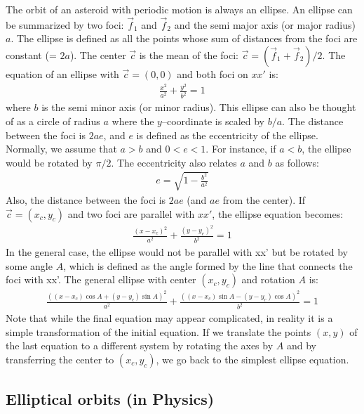 \begin{appendices}
The orbit of an asteroid with periodic motion is always an ellipse. An ellipse can be summarized by two foci: $\vec{f}_1$ and $\vec{f}_2$ and the semi major axis (or major radius) $a$. The ellipse is defined as all the points whose sum of distances from the foci are constant (= $2a$). The center $\vec{c}$ is the mean of the foci: $\vec{c} = (\vec{f}_1 + \vec{f}_2) / 2$. The equation of an ellipse with $\vec{c} = (0,0)$ and both foci on $xx'$ is:
\begin{eqnarray*}
\frac{x^2}{a^2} + \frac{y^2}{b^2} = 1
\end{eqnarray*}
where $b$ is the semi minor axis (or minor radius). This ellipse can also be thought of as a circle of radius $a$ where the $y$--coordinate is scaled by $b/a$. The distance between the foci is $2ae$, and $e$ is defined as the eccentricity of the ellipse. Normally, we assume that $a > b$ and $0 < e < 1$. For instance, if $a < b$, the ellipse would be rotated by $\pi/2$. The eccentricity also relates $a$ and $b$ as follows:
\begin{eqnarray*}
e = \sqrt{1 - \frac{b^2}{a^2}}
\end{eqnarray*}
Also, the distance between the foci is $2ae$ (and $ae$ from the center). If $\vec{c} = (x_c,y_c)$ and two foci are parallel with $xx'$, the ellipse equation becomes:
\begin{eqnarray*}
\frac{(x-x_c)^2}{a^2} + \frac{(y-y_c)^2}{b^2} = 1
\end{eqnarray*}
In the general case, the ellipse would not be parallel with xx' but be rotated by some angle $A$, which is defined as the angle formed by the line that connects the foci with xx'. The general ellipse with center $(x_c,y_c)$ and rotation $A$ is:
\begin{eqnarray*}
\frac{((x-x_c)\cos{A} + (y-y_c)\sin{A})^2}{a^2} + \frac{((x-x_c)\sin{A} - (y-y_c)\cos{A})^2}{b^2} = 1
\end{eqnarray*}
Note that while the final equation may appear complicated, in reality it is a simple transformation of the initial equation. If we translate the points $(x,y)$ of the last equation to a different system by rotating the axes by $A$ and by transferring the center to $(x_c,y_c)$, we go back to the simplest ellipse equation.

\subsection{Elliptical orbits (in Physics)}


\end{appendices}
